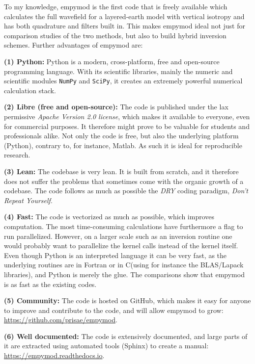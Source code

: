 \documentclass[manuscript]{geophysics}
\newcommand{\tnt}[1]{#1}
\newcommand{\fortran}{\tnt{Fortran}\xspace}
\newcommand{\python}{\tnt{Python}\xspace}
\newcommand{\matlab}{\tnt{Matlab}\xspace}
\newcommand{\cc}{\tnt{C}\xspace}
\newcommand{\empymod}{\tnt{empymod}\xspace}
\begin{document}
To my knowledge, \empymod is the first code that is freely available which
calculates the full wavefield for a layered-earth model with vertical isotropy
and has both quadrature and filters built in. This makes \empymod ideal not
just for comparison studies of the two methods, but also to build hybrid
inversion schemes.  Further advantages of \empymod are:

\textbf{(1) \python:} \python is a modern, cross-platform, free and open-source
programming language. With its scientific libraries, mainly the numeric and
scientific modules \texttt{NumPy} and \texttt{SciPy}, it creates an extremely
powerful numerical calculation stack.

\textbf{(2) Libre (free and open-source):} The code is published under the lax
permissive \emph{Apache Version 2.0 license}, which makes it available to
everyone, even for commercial purposes. It therefore might prove to be valuable
for students and professionals alike. Not only the code is free, but also the
underlying platform (\python), contrary to, for instance, \matlab. As such it
is ideal for reproducible research.

\textbf{(3) Lean:} The codebase is very lean. It is built from scratch, and it
therefore does not suffer the problems that sometimes come with the organic
growth of a codebase. The code follows as much as possible the \emph{DRY}
coding paradigm, \emph{Don't Repeat Yourself}.

\textbf{(4) Fast:} The code is vectorized as much as possible, which improves
computation. The most time-consuming calculations have furthermore a flag to
run parallelized. However, on a larger scale such as an inversion routine one
would probably want to parallelize the kernel calls instead of the kernel
itself. Even though \python is an interpreted language it can be very fast, as
the underlying routines are in \fortran or in \cc (using for instance the
BLAS/Lapack libraries), and \python is merely the glue. The comparisons show
that \empymod is as fast as the existing codes.

\textbf{(5) Community:} The code is hosted on GitHub, which makes it easy for
anyone to improve and contribute to the code, and will allow \empymod to
grow:\\
\url{https://github.com/prisae/empymod}.

\textbf{(6) Well documented:} The code is extensively documented, and large
parts of it are extracted using automated tools (Sphinx) to create a manual:\\
\url{https://empymod.readthedocs.io}.
\end{document}

